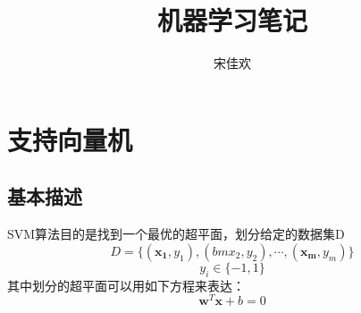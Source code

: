 \documentclass[UTF8]{ctexart} %
\title{机器学习笔记}
\author{宋佳欢}
\begin{document}
	\maketitle
	\tableofcontents
	\songti {}
	
	\section{支持向量机}
		\begin{multicols}{2}
			\subsection{基本描述}
				SVM算法目的是找到一个最优的超平面，划分给定的数据集D
				\[D=\{(\bm{x_1},y_1),(bm{x_2},y_2),\cdots,(\bm{x_m},y_m)\}\]
				\[y_i\in \{-1,1\}\nonumber\]
				其中划分的超平面可以用如下方程来表达：
				\[\bm{w}^T\bm{x}+b=0\]
				

\end{multicols}
\end{document}

